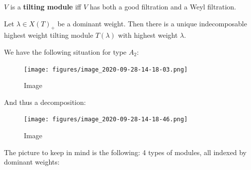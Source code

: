 \begin{definition}

\begin{definition}

\(V\) is a \textbf{tilting module} iff \(V\) has both a good filtration
and a Weyl filtration.

\end{definition}

\end{definition}

\begin{theorem}[Ringel, 1990s]

\begin{theorem}[Ringel, 1990s]

Let \(\lambda \in X(T)_+\) be a dominant weight. Then there is a unique
indecomposable highest weight tilting module \(T(\lambda)\) with highest
weight \(\lambda\).

\end{theorem}

\end{theorem}

\begin{example}

\begin{example}

We have the following situation for type \(A_2\):

\begin{figure}
\centering
\texttt{[image: figures/image\_2020-09-28-14-18-03.png]}
\caption{Image}
\end{figure}

And thus a decomposition:

\begin{figure}
\centering
\texttt{[image: figures/image\_2020-09-28-14-18-46.png]}
\caption{Image}
\end{figure}

\end{example}

\end{example}

The picture to keep in mind is the following: 4 types of modules, all
indexed by dominant weights:

\begin{center}
\end{center}

